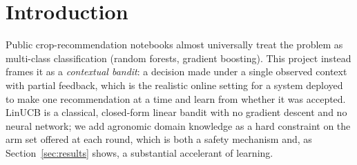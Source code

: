 \section{Introduction}
Public crop-recommendation notebooks almost universally treat the problem
as multi-class classification (random forests, gradient boosting). This
project instead frames it as a \emph{contextual bandit}: a decision made
under a single observed context with partial feedback, which is the
realistic online setting for a system deployed to make one recommendation
at a time and learn from whether it was accepted. LinUCB \cite{li2010linucb}
is a classical, closed-form linear bandit with no gradient descent and no
neural network; we add agronomic domain knowledge as a hard constraint on
the arm set offered at each round, which is both a safety mechanism and, as
Section~\ref{sec:results} shows, a substantial accelerant of learning.
